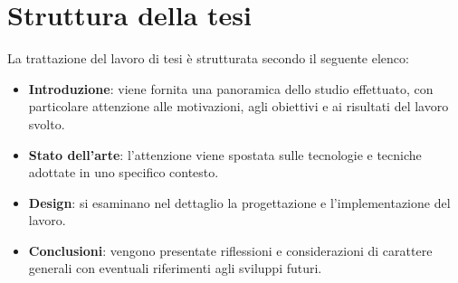 \section{Struttura della tesi}
La trattazione del lavoro di tesi è strutturata secondo il seguente elenco:
\begin{itemize}
    \item \textbf{Introduzione}: viene fornita una panoramica dello studio effettuato, con particolare attenzione alle motivazioni, 
    agli obiettivi e ai risultati del lavoro svolto.
    \item \textbf{Stato dell'arte}: l'attenzione viene spostata sulle tecnologie e tecniche adottate in uno specifico contesto.
    \item \textbf{Design}: si esaminano nel dettaglio la progettazione e l'implementazione del lavoro.
    \item \textbf{Conclusioni}: vengono presentate riflessioni e considerazioni di carattere generali con eventuali riferimenti
    agli sviluppi futuri.
\end{itemize}
